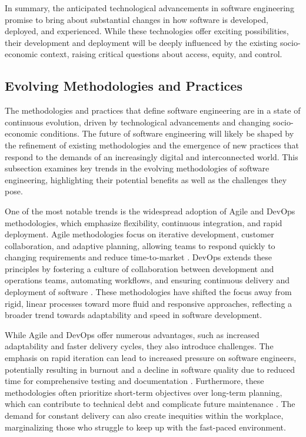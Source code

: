 \begin{refsection}
In summary, the anticipated technological advancements in software engineering promise to bring about substantial changes in how software is developed, deployed, and experienced. While these technologies offer exciting possibilities, their development and deployment will be deeply influenced by the existing socio-economic context, raising critical questions about access, equity, and control.

\subsection{Evolving Methodologies and Practices}

The methodologies and practices that define software engineering are in a state of continuous evolution, driven by technological advancements and changing socio-economic conditions. The future of software engineering will likely be shaped by the refinement of existing methodologies and the emergence of new practices that respond to the demands of an increasingly digital and interconnected world. This subsection examines key trends in the evolving methodologies of software engineering, highlighting their potential benefits as well as the challenges they pose.

One of the most notable trends is the widespread adoption of Agile and DevOps methodologies, which emphasize flexibility, continuous integration, and rapid deployment. Agile methodologies focus on iterative development, customer collaboration, and adaptive planning, allowing teams to respond quickly to changing requirements and reduce time-to-market \cite[pp.~15-18]{beck1999extreme}. DevOps extends these principles by fostering a culture of collaboration between development and operations teams, automating workflows, and ensuring continuous delivery and deployment of software \cite[pp.~28-30]{kim2018accelerate}. These methodologies have shifted the focus away from rigid, linear processes toward more fluid and responsive approaches, reflecting a broader trend towards adaptability and speed in software development.

While Agile and DevOps offer numerous advantages, such as increased adaptability and faster delivery cycles, they also introduce challenges. The emphasis on rapid iteration can lead to increased pressure on software engineers, potentially resulting in burnout and a decline in software quality due to reduced time for comprehensive testing and documentation \cite[pp.~37-39]{martin2022clean}. Furthermore, these methodologies often prioritize short-term objectives over long-term planning, which can contribute to technical debt and complicate future maintenance \cite[pp.~95-98]{fowler1999refactoring}. The demand for constant delivery can also create inequities within the workplace, marginalizing those who struggle to keep up with the fast-paced environment.


\end{refsection}
